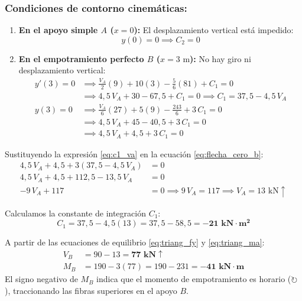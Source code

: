 \subsubsection*{Condiciones de contorno cinemáticas:}
\begin{enumerate}
    \item \textbf{En el apoyo simple $A$ ($x = 0$):} El desplazamiento vertical está impedido:
          \begin{equation}
              y(0) = 0 \implies C_2 = 0
          \end{equation}
    \item \textbf{En el empotramiento perfecto $B$ ($x = 3\text{ m}$):} No hay giro ni desplazamiento vertical:
          \begin{align}
              y'(3) = 0 & \implies \frac{V_A}{2}(9) + 10(3) - \frac{5}{6}(81) + C_1 = 0 \nonumber \\
                        & \implies 4{,}5\,V_A + 30 - 67{,}5 + C_1 = 0 \implies \boxed{C_1 = 37{,}5 - 4{,}5\,V_A} \label{eq:c1_va} \\[6pt]
              y(3) = 0  & \implies \frac{V_A}{6}(27) + 5(9) - \frac{243}{6} + 3\,C_1 = 0 \nonumber \\
                        & \implies 4{,}5\,V_A + 45 - 40{,}5 + 3\,C_1 = 0 \nonumber \\
                        & \implies 4{,}5\,V_A + 4{,}5 + 3\,C_1 = 0 \label{eq:flecha_cero_b}
          \end{align}
\end{enumerate}

Sustituyendo la expresión \eqref{eq:c1_va} en la ecuación \eqref{eq:flecha_cero_b}:
\begin{align}
    4{,}5\,V_A + 4{,}5 + 3(37{,}5 - 4{,}5\,V_A) & = 0 \nonumber \\
    4{,}5\,V_A + 4{,}5 + 112{,}5 - 13{,}5\,V_A   & = 0 \nonumber \\
    -9\,V_A + 117                               & = 0 \implies 9\,V_A = 117 \implies \boxed{V_A = 13\text{ kN}\uparrow}
\end{align}

Calculamos la constante de integración $C_1$:
\begin{equation}
    C_1 = 37{,}5 - 4{,}5(13) = 37{,}5 - 58{,}5 = \mathbf{-21\text{ kN}\cdot\text{m}^2}
\end{equation}

A partir de las ecuaciones de equilibrio \eqref{eq:triang_fy} y \eqref{eq:triang_ma}:
\begin{align}
    V_B & = 90 - 13 = \mathbf{77\text{ kN}\uparrow} \\[6pt]
    M_B & = 190 - 3(77) = 190 - 231 = \mathbf{-41\text{ kN}\cdot\text{m}}
\end{align}
El signo negativo de $M_B$ indica que el momento de empotramiento es horario ($\circlearrowright$), traccionando las fibras superiores en el apoyo $B$.

